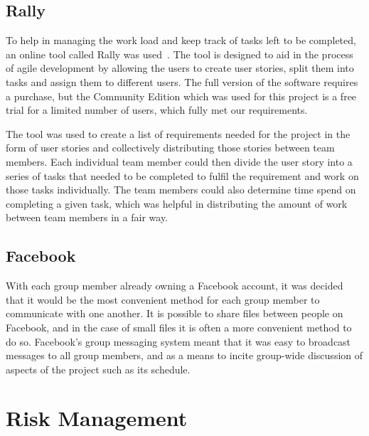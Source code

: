     \subsection{Rally}    
        To help in managing the work load and keep track of tasks left to be completed, an online tool called Rally was used~\cite{rally}. The tool is designed to aid in the process of agile development by allowing the users to create user stories, split them into tasks and assign them to different users. The full version of the software requires a purchase, but the Community Edition which was used for this project is a free trial for a limited number of users, which fully met our requirements.
    
        The tool was used to create a list of requirements needed for the project in the form of user stories and collectively distributing those stories between team members. Each individual team member could then divide the user story into a series of tasks that needed to be completed to fulfil the requirement and work on those tasks individually. The team members could also determine time spend on completing a given task, which was helpful in distributing the amount of work between team members in a fair way.
    
    \subsection{Facebook}
    
        With each group member already owning a Facebook account, it was decided that it would be the most convenient method for each group member to communicate with one another. It is possible to share files between people on Facebook, and in the case of small files it is often a more convenient method to do so. Facebook's group messaging system meant that it was easy to broadcast messages to all group members, and as a means to incite group-wide discussion of aspects of the project such as its schedule. 

\section{Risk Management}

